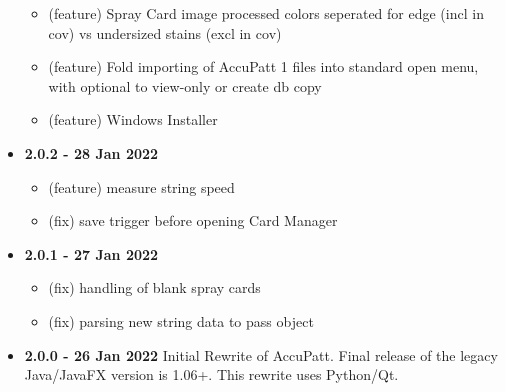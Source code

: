 \documentclass[10pt,letterpaper,titlepage]{article}
\begin{document}
\begin{itemize}
\begin{itemize}
            \item (feature) Spray Card image processed colors seperated for edge (incl in cov) vs undersized stains (excl in cov)
            \item (feature) Fold importing of AccuPatt 1 files into standard open menu, with optional to view-only or create db copy
            \item (feature) Windows Installer
        \end{itemize}
        \item \textbf{2.0.2 - 28 Jan 2022}
        \begin{itemize}
            \item (feature) measure string speed
            \item (fix) save trigger before opening Card Manager
        \end{itemize}
        \item \textbf{2.0.1 - 27 Jan 2022}
        \begin{itemize}
            \item (fix) handling of blank spray cards
            \item (fix) parsing new string data to pass object
        \end{itemize}
        \item \textbf{2.0.0 - 26 Jan 2022} Initial Rewrite of AccuPatt. Final release of the legacy Java/JavaFX version is 1.06+. This rewrite uses Python/Qt.
    \end{itemize}
\end{document}
